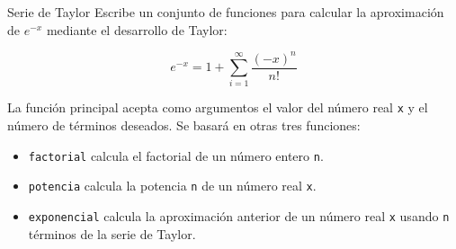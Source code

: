 \documentclass[xcolor={usenames,svgnames,dvipsnames}]{beamer}
\begin{document}
\begin{frame}[label={sec:org7fc2398},fragile]{Serie de Taylor}
 Escribe un conjunto de funciones para calcular la aproximación de \(e ^ {-x}\) mediante el desarrollo de Taylor:

\[
  e^{-x} = 1 + \sum_{i = 1}^\infty \frac{(-x)^n}{n!}
  \]

La función principal acepta como argumentos el valor del número real \texttt{x} y el número de términos deseados. Se basará en otras tres funciones: 

\begin{itemize}
\item \texttt{factorial} calcula el factorial de un número entero \texttt{n}.

\item \texttt{potencia} calcula la potencia \texttt{n} de un número real \texttt{x}.

\item \texttt{exponencial} calcula la aproximación anterior de un número real \texttt{x} usando \texttt{n} términos de la serie de Taylor.
\end{itemize}
\end{frame}
\end{document}

